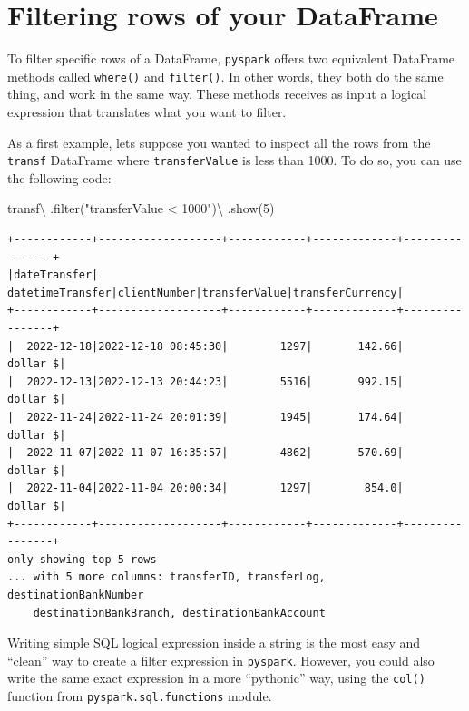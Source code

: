 \documentclass[
  11pt,
  letterpaper,
  DIV=11,
  numbers=noendperiod]{scrreprt}
\newenvironment{Shaded}{\begin{snugshade}}{\end{snugshade}}
\newcommand{\BuiltInTok}[1]{\textcolor[rgb]{0.00,0.23,0.31}{#1}}
\newcommand{\DecValTok}[1]{\textcolor[rgb]{0.68,0.00,0.00}{#1}}
\newcommand{\NormalTok}[1]{\textcolor[rgb]{0.00,0.23,0.31}{#1}}
\newcommand{\OperatorTok}[1]{\textcolor[rgb]{0.37,0.37,0.37}{#1}}
\newcommand{\StringTok}[1]{\textcolor[rgb]{0.13,0.47,0.30}{#1}}
\begin{document}
\hypertarget{filtering-rows-of-your-dataframe}{%
\section{Filtering rows of your
DataFrame}\label{filtering-rows-of-your-dataframe}}

To filter specific rows of a DataFrame, \texttt{pyspark} offers two
equivalent DataFrame methods called \texttt{where()} and
\texttt{filter()}. In other words, they both do the same thing, and work
in the same way. These methods receives as input a logical expression
that translates what you want to filter.

As a first example, lets suppose you wanted to inspect all the rows from
the \texttt{transf} DataFrame where \texttt{transferValue} is less than
1000. To do so, you can use the following code:

\begin{Shaded}
\begin{Highlighting}[]
\NormalTok{transf}\OperatorTok{\textbackslash{}}
\NormalTok{  .}\BuiltInTok{filter}\NormalTok{(}\StringTok{"transferValue \textless{} 1000"}\NormalTok{)}\OperatorTok{\textbackslash{}}
\NormalTok{  .show(}\DecValTok{5}\NormalTok{)}
\end{Highlighting}
\end{Shaded}

\begin{verbatim}
+------------+-------------------+------------+-------------+----------------+
|dateTransfer|   datetimeTransfer|clientNumber|transferValue|transferCurrency|
+------------+-------------------+------------+-------------+----------------+
|  2022-12-18|2022-12-18 08:45:30|        1297|       142.66|        dollar $|
|  2022-12-13|2022-12-13 20:44:23|        5516|       992.15|        dollar $|
|  2022-11-24|2022-11-24 20:01:39|        1945|       174.64|        dollar $|
|  2022-11-07|2022-11-07 16:35:57|        4862|       570.69|        dollar $|
|  2022-11-04|2022-11-04 20:00:34|        1297|        854.0|        dollar $|
+------------+-------------------+------------+-------------+----------------+
only showing top 5 rows
... with 5 more columns: transferID, transferLog, destinationBankNumber
    destinationBankBranch, destinationBankAccount
\end{verbatim}

Writing simple SQL logical expression inside a string is the most easy
and ``clean'' way to create a filter expression in \texttt{pyspark}.
However, you could also write the same exact expression in a more
``pythonic'' way, using the \texttt{col()} function from
\texttt{pyspark.sql.functions} module.
\end{document}
